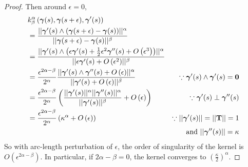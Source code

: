 \documentclass[../dissertation.tex]{subfiles}
\begin{document}
\begin{lemma}
\begin{proof}
        Then around $\epsilon = 0$,
        \begin{align*}
            & k_{\beta}^{\alpha} \left( \boldsymbol{\gamma}(s), \boldsymbol{\gamma}(s + \epsilon), \boldsymbol{\gamma}'(s) \right)
            \\
            &= 
            \frac{\lvert \lvert \boldsymbol{\gamma}'(s) \wedge \left( \boldsymbol{\gamma}(s+\epsilon) - \boldsymbol{\gamma}(s) \right) \rvert \rvert^{\alpha}}{\lvert \lvert \boldsymbol{\gamma}(s+\epsilon) - \boldsymbol{\gamma}(s) \rvert \rvert^{\beta}} \\
            &= 
            \frac{\lvert \lvert \boldsymbol{\gamma}'(s) \wedge \left( \epsilon \boldsymbol{\gamma}'(s) + \frac{1}{2} \epsilon^2 \boldsymbol{\gamma}''(s) + O\left( \epsilon^3 \right) \right) \rvert \rvert^{\alpha}}{\lvert \lvert \epsilon \boldsymbol{\gamma}'(s) + O \left( \epsilon^2 \right) \rvert \rvert^{\beta}} \\
            &=
            \frac{\epsilon^{2\alpha - \beta}}{2^{\alpha}}
            \frac{\lvert \lvert \boldsymbol{\gamma}'(s) \wedge \boldsymbol{\gamma}''(s) + O\left( \epsilon \right) \rvert \rvert^{\alpha}}{\lvert \lvert \boldsymbol{\gamma}'(s) + O \left( \epsilon \right) \rvert \rvert^{\beta}}
            &
            \because \boldsymbol{\gamma}'(s) \wedge \boldsymbol{\gamma}'(s) = \mathbf{0}
            \\
            &= 
            \frac{\epsilon^{2\alpha - \beta}}{2^{\alpha}}
            \left( \frac{\lvert \lvert \boldsymbol{\gamma}'(s) \rvert \rvert^{\alpha}\lvert \lvert \boldsymbol{\gamma}''(s) \rvert \rvert^{\alpha}}{\lvert \lvert \boldsymbol{\gamma}'(s) \rvert \rvert^{\beta}} + O \left( \epsilon \right) \right)
            &
            \because \boldsymbol{\gamma}'(s) \perp \boldsymbol{\gamma}''(s)
            \\
            &= 
            \frac{\epsilon^{2\alpha - \beta}}{2^{\alpha}}
            \left( \kappa^{\alpha} + O \left( \epsilon \right) \right)
            &
            \because \lvert \lvert \boldsymbol{\gamma}'(s) \rvert \rvert = \lvert \lvert \mathbf{T} \rvert \rvert=1
            \\
            &&\text{and } \lvert \lvert \boldsymbol{\gamma}''(s) \rvert \rvert = \kappa
        \end{align*}
        So with arc-length perturbation of $\epsilon$, the order of singularity of the kernel is $O \left( \epsilon^{2\alpha - \beta} \right)$. In particular, if $2\alpha - \beta = 0$, the kernel converges to $\left( \frac{\kappa}{2} \right)^{\alpha}$.
    \end{proof}
\end{lemma}
\end{document}
